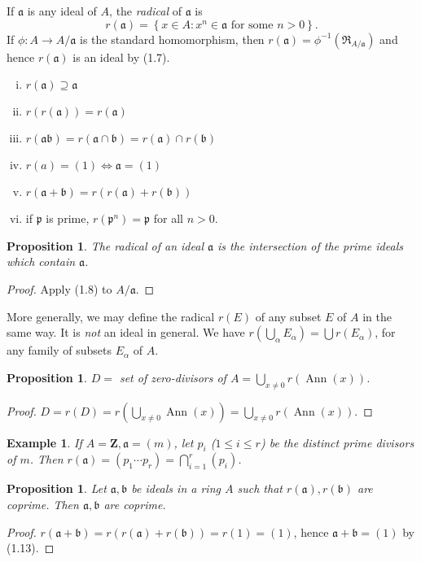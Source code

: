 \documentclass[class=book, crop=false]{standalone}
\newtheorem{proposition}[theorem]{Proposition}
\newtheorem*{example}{Example}
\theoremstyle{definition}
\theoremstyle{remark}
\begin{document}
If $\mathfrak{a}$ is any ideal of $A$, the \textit{radical} of $\mathfrak{a}$ is
\[
  r(\mathfrak{a})=\left\{x \in A: x^{n} \in \mathfrak{a} \text { for some } n>0\right\}.
\]
If $\phi: A \to A / \mathfrak{a}$ is the standard homomorphism, then
$r(\mathfrak{a})=\phi^{-1}\left(\mathfrak{R}_{A / \mathfrak{a}}\right)$ and
hence $r(\mathfrak{a})$ is an ideal by (1.7).
\begin{exercise}
  \begin{enumerate}[i)]
    \item $r(\mathfrak{a}) \supseteq \mathfrak{a}$
    \item $r(r(\mathfrak{a}))=r(\mathfrak{a})$
    \item
          $r(\mathfrak{a} \mathfrak{b})=r(\mathfrak{a} \cap \mathfrak{b})=r(\mathfrak{a}) \cap r(\mathfrak{b})$
    \item $r(a)=(1) \iff \mathfrak{a}=(1)$
    \item $r(\mathfrak{a}+\mathfrak{b})=r(r(\mathfrak{a})+r(\mathfrak{b}))$
    \item if $\mathfrak{p}$ is prime,
          $r\left(\mathfrak{p}^{n}\right)=\mathfrak{p}$ for all $n>0$.
  \end{enumerate}
\end{exercise}
\begin{proposition}
  The radical of an ideal $\mathfrak{a}$ is the intersection of the prime ideals
  which contain $\mathfrak{a}$.
\end{proposition}
\begin{proof}
  Apply (1.8) to $A / \mathfrak{a}$.
\end{proof}

More generally, we may define the radical $r(E)$ of any subset $E$ of $A$ in the
same way. It is \textit{not} an ideal in general. We have
$r\left(\bigcup_{\alpha} E_{\alpha}\right)=\bigcup r\left(E_{\alpha}\right)$,
for any family of subsets $E_{\alpha}$ of $A$.
\begin{proposition}
  $D=$ set of zero-divisors of $A=\bigcup_{x \neq 0} r(\operatorname{Ann}(x))$.
\end{proposition}
\begin{proof}
  $D=r(D)=r\left(\bigcup_{x \neq 0}\operatorname{Ann}(x)\right)=\bigcup_{x \neq 0} r(\operatorname{Ann}(x))$.
\end{proof}
\begin{example}
  If $A=\mathbf{Z}, \mathfrak{a}=(m)$, let $p_{i}$ ($1 \leq i \leq r$) be the
  distinct prime divisors of $m$. Then
  $r(\mathfrak{a})=\left(p_{1} \cdots p_{r}\right)=\bigcap_{i=1}^{r}\left(p_{i}\right)$.
\end{example}
\begin{proposition}
  Let $\mathfrak{a}, \mathfrak{b}$ be ideals in a ring $A$ such that
  $r(\mathfrak{a}), r(\mathfrak{b})$ are coprime. Then
  $\mathfrak{a}, \mathfrak{b}$ are coprime.
\end{proposition}
\begin{proof}
  $r(\mathfrak{a}+\mathfrak{b})=r(r(\mathfrak{a})+r(\mathfrak{b}))=r(1)=(1)$,
  hence $\mathfrak{a}+\mathfrak{b}=(1)$ by (1.13).
\end{proof}
\end{document}
